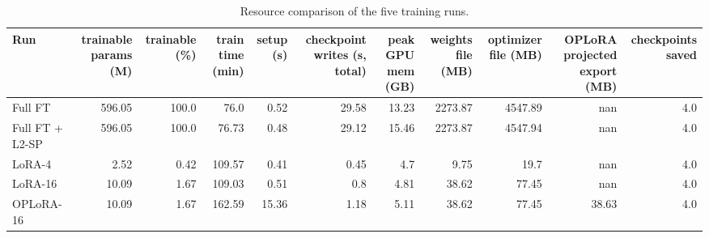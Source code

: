 \begin{table}[t]
\centering\small
\begin{tabular}{lrrrrrrrrrr}
\toprule
Run & trainable params (M) & trainable (\%) & train time (min) & setup (s) & checkpoint writes (s, total) & peak GPU mem (GB) & weights file (MB) & optimizer file (MB) & OPLoRA projected export (MB) & checkpoints saved \\
\midrule
Full FT & 596.05 & 100.0 & 76.0 & 0.52 & 29.58 & 13.23 & 2273.87 & 4547.89 & nan & 4.0 \\
Full FT + L2-SP & 596.05 & 100.0 & 76.73 & 0.48 & 29.12 & 15.46 & 2273.87 & 4547.94 & nan & 4.0 \\
LoRA-4 & 2.52 & 0.42 & 109.57 & 0.41 & 0.45 & 4.7 & 9.75 & 19.7 & nan & 4.0 \\
LoRA-16 & 10.09 & 1.67 & 109.03 & 0.51 & 0.8 & 4.81 & 38.62 & 77.45 & nan & 4.0 \\
OPLoRA-16 & 10.09 & 1.67 & 162.59 & 15.36 & 1.18 & 5.11 & 38.62 & 77.45 & 38.63 & 4.0 \\
\bottomrule
\end{tabular}
\caption{Resource comparison of the five training runs.}
\label{tab:task1_resources}
\end{table}
